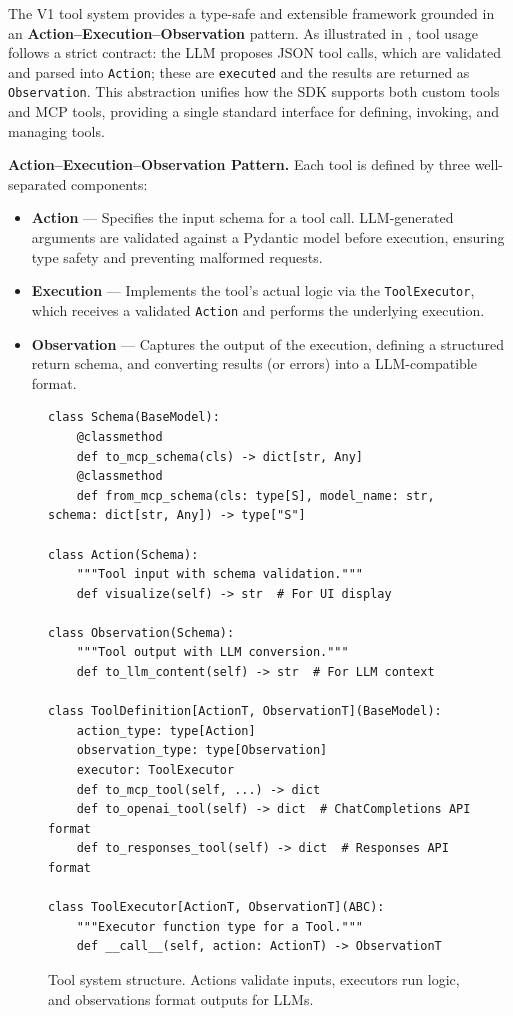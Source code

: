 The V1 tool system provides a type-safe and extensible framework grounded in an \textbf{Action–Execution–Observation} pattern. As illustrated in , tool usage follows a strict contract: the LLM proposes JSON tool calls, which are validated and parsed into \texttt{Action}; these are \texttt{executed} and the results are returned as \texttt{Observation}.
% 
This abstraction unifies how the SDK supports both custom tools and MCP tools, providing a single standard interface for defining, invoking, and managing tools.

\textbf{Action–Execution–Observation Pattern.}
Each tool is defined by three well-separated components:
\begin{itemize}[itemsep=2pt,topsep=0pt,parsep=0pt,partopsep=0pt,leftmargin=8pt]
    \item \textbf{Action} — Specifies the input schema for a tool call. LLM-generated arguments are validated against a Pydantic model before execution, ensuring type safety and preventing malformed requests.
    \item \textbf{Execution} — Implements the tool’s actual logic via the \texttt{ToolExecutor}, which receives a validated \texttt{Action} and performs the underlying execution.
    \item \textbf{Observation} — Captures the output of the execution, defining a structured return schema, and converting results (or errors) into a LLM-compatible format.
\end{itemize}

\begin{figure}[!ht]
\begin{verbatim}
class Schema(BaseModel):
    @classmethod
    def to_mcp_schema(cls) -> dict[str, Any]
    @classmethod
    def from_mcp_schema(cls: type[S], model_name: str, schema: dict[str, Any]) -> type["S"]

class Action(Schema):
    """Tool input with schema validation."""
    def visualize(self) -> str  # For UI display

class Observation(Schema):
    """Tool output with LLM conversion."""
    def to_llm_content(self) -> str  # For LLM context

class ToolDefinition[ActionT, ObservationT](BaseModel):
    action_type: type[Action]
    observation_type: type[Observation]
    executor: ToolExecutor
    def to_mcp_tool(self, ...) -> dict
    def to_openai_tool(self) -> dict  # ChatCompletions API format
    def to_responses_tool(self) -> dict  # Responses API format

class ToolExecutor[ActionT, ObservationT](ABC):
    """Executor function type for a Tool."""
    def __call__(self, action: ActionT) -> ObservationT
\end{verbatim}
\caption{Tool system structure. Actions validate inputs, executors run logic, and observations format outputs for LLMs.}
\label{fig:tool-definition}
\end{figure}


